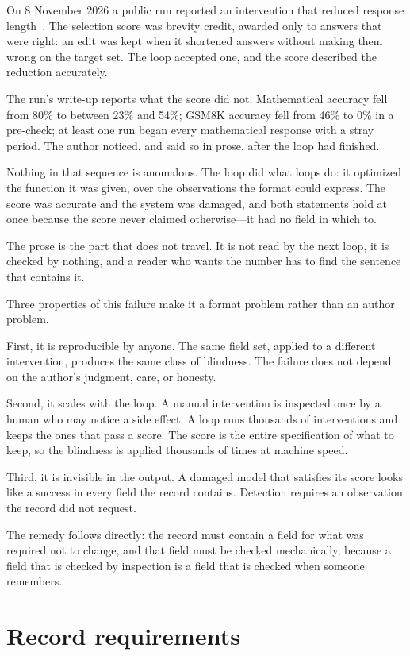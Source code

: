 \documentclass[11pt]{article}
\begin{document}
On 8 November 2026 a public run reported an intervention that reduced response
length~\cite{beaker}. The selection score was brevity credit, awarded only to
answers that were right: an edit was kept when it shortened answers without
making them wrong on the target set. The loop accepted one, and the score
described the reduction accurately.

The run's write-up reports what the score did not. Mathematical accuracy fell
from 80\% to between 23\% and 54\%; GSM8K accuracy fell from 46\% to 0\% in a
pre-check; at least one run began every mathematical response with a stray
period. The author noticed, and said so in prose, after the loop had finished.

Nothing in that sequence is anomalous. The loop did what loops do: it optimized
the function it was given, over the observations the format could express. The
score was accurate and the system was damaged, and both statements hold at once
because the score never claimed otherwise---it had no field in which to.

The prose is the part that does not travel. It is not read by the next loop, it
is checked by nothing, and a reader who wants the number has to find the
sentence that contains it.

Three properties of this failure make it a format problem rather than an author
problem.

First, it is reproducible by anyone. The same field set, applied to a different
intervention, produces the same class of blindness. The failure does not depend
on the author's judgment, care, or honesty.

Second, it scales with the loop. A manual intervention is inspected once by a
human who may notice a side effect. A loop runs thousands of interventions and
keeps the ones that pass a score. The score is the entire specification of what
to keep, so the blindness is applied thousands of times at machine speed.

Third, it is invisible in the output. A damaged model that satisfies its score
looks like a success in every field the record contains. Detection requires an
observation the record did not request.

The remedy follows directly: the record must contain a field for what was
required not to change, and that field must be checked mechanically, because a
field that is checked by inspection is a field that is checked when someone
remembers.

\section{Record requirements}
\end{document}
